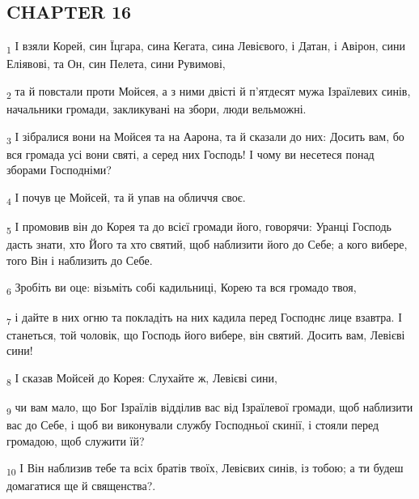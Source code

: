 \subsection{CHAPTER 16}
\begin{tcolorbox}
\textsubscript{1} І взяли Корей, син Їцгара, сина Кегата, сина Левієвого, і Датан, і Авірон, сини Еліявові, та Он, син Пелета, сини Рувимові,
\end{tcolorbox}
\begin{tcolorbox}
\textsubscript{2} та й повстали проти Мойсея, а з ними двісті й п'ятдесят мужа Ізраїлевих синів, начальники громади, закликувані на збори, люди вельможні.
\end{tcolorbox}
\begin{tcolorbox}
\textsubscript{3} І зібралися вони на Мойсея та на Аарона, та й сказали до них: Досить вам, бо вся громада усі вони святі, а серед них Господь! І чому ви несетеся понад зборами Господніми?
\end{tcolorbox}
\begin{tcolorbox}
\textsubscript{4} І почув це Мойсей, та й упав на обличчя своє.
\end{tcolorbox}
\begin{tcolorbox}
\textsubscript{5} І промовив він до Корея та до всієї громади його, говорячи: Уранці Господь дасть знати, хто Його та хто святий, щоб наблизити його до Себе; а кого вибере, того Він і наблизить до Себе.
\end{tcolorbox}
\begin{tcolorbox}
\textsubscript{6} Зробіть ви оце: візьміть собі кадильниці, Корею та вся громадо твоя,
\end{tcolorbox}
\begin{tcolorbox}
\textsubscript{7} і дайте в них огню та покладіть на них кадила перед Господнє лице взавтра. І станеться, той чоловік, що Господь його вибере, він святий. Досить вам, Левієві сини!
\end{tcolorbox}
\begin{tcolorbox}
\textsubscript{8} І сказав Мойсей до Корея: Слухайте ж, Левієві сини,
\end{tcolorbox}
\begin{tcolorbox}
\textsubscript{9} чи вам мало, що Бог Ізраїлів відділив вас від Ізраїлевої громади, щоб наблизити вас до Себе, і щоб ви виконували службу Господньої скинії, і стояли перед громадою, щоб служити їй?
\end{tcolorbox}
\begin{tcolorbox}
\textsubscript{10} І Він наблизив тебе та всіх братів твоїх, Левієвих синів, із тобою; а ти будеш домагатися ще й священства?.
\end{tcolorbox}
